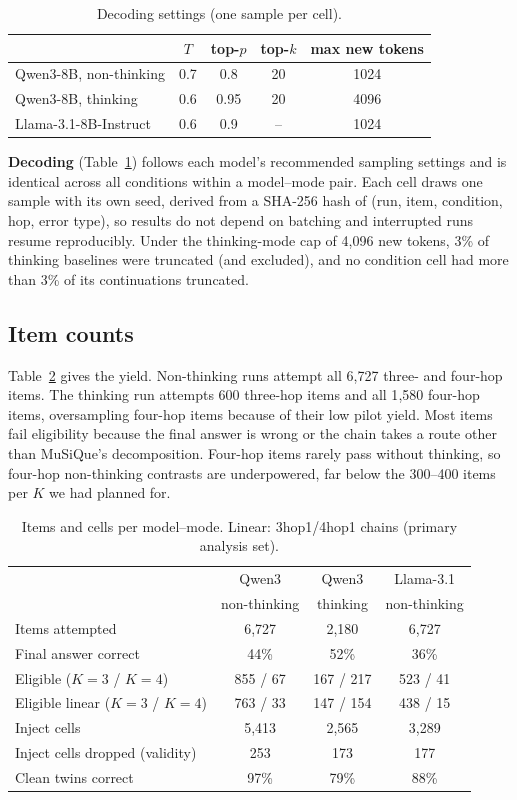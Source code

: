 \documentclass[conference]{IEEEtran}
\begin{document}
\begin{table}[t]
\centering
\caption{Decoding settings (one sample per cell).}
\label{tab:decoding}
\begin{tabular}{lcccc}
\toprule
 & $T$ & top-$p$ & top-$k$ & max new tokens \\
\midrule
Qwen3-8B, non-thinking & 0.7 & 0.8 & 20 & 1024 \\
Qwen3-8B, thinking & 0.6 & 0.95 & 20 & 4096 \\
Llama-3.1-8B-Instruct & 0.6 & 0.9 & -- & 1024 \\
\bottomrule
\end{tabular}
\end{table}

\textbf{Decoding} (Table~\ref{tab:decoding}) follows each model's recommended sampling settings and is identical across all conditions within a model--mode pair. Each cell draws one sample with its own seed, derived from a SHA-256 hash of (run, item, condition, hop, error type), so results do not depend on batching and interrupted runs resume reproducibly. Under the thinking-mode cap of 4{,}096 new tokens, 3\% of thinking baselines were truncated (and excluded), and no condition cell had more than 3\% of its continuations truncated.

\subsection{Item counts}
Table~\ref{tab:counts} gives the yield. Non-thinking runs attempt all 6{,}727 three- and four-hop items. The thinking run attempts 600 three-hop items and all 1{,}580 four-hop items, oversampling four-hop items because of their low pilot yield. Most items fail eligibility because the final answer is wrong or the chain takes a route other than MuSiQue's decomposition. Four-hop items rarely pass without thinking, so four-hop non-thinking contrasts are underpowered, far below the 300--400 items per $K$ we had planned for.

\begin{table}[t]
\centering
\caption{Items and cells per model--mode. Linear: 3hop1/4hop1 chains (primary analysis set).}
\label{tab:counts}
\footnotesize
\setlength{\tabcolsep}{3pt}
\begin{tabular}{lccc}
\toprule
 & Qwen3 & Qwen3 & Llama-3.1 \\
 & non-thinking & thinking & non-thinking \\
\midrule
Items attempted & 6{,}727 & 2{,}180 & 6{,}727 \\
Final answer correct & 44\% & 52\% & 36\% \\
Eligible ($K{=}3$ / $K{=}4$) & 855 / 67 & 167 / 217 & 523 / 41 \\
Eligible linear ($K{=}3$ / $K{=}4$) & 763 / 33 & 147 / 154 & 438 / 15 \\
Inject cells & 5{,}413 & 2{,}565 & 3{,}289 \\
Inject cells dropped (validity) & 253 & 173 & 177 \\
Clean twins correct & 97\% & 79\% & 88\% \\
\bottomrule
\end{tabular}
\end{table}
\end{document}
